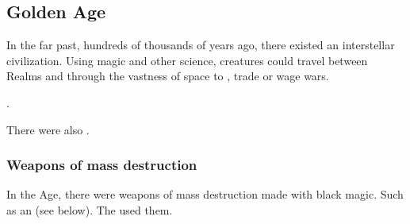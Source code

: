 \subsection{\Ophidian Golden Age}
In the far past, hundreds of thousands of years ago, there existed an \ophidian interstellar civilization. 
Using magic and other science, creatures could travel between Realms and through the vastness of space to \cooperate, trade or wage wars. 

\Sethicus {}. 

There were also . 





\subsubsection{Weapons of mass destruction}
In the \Ophidian Age, there were weapons of mass destruction made with black magic. 
Such as an  (see below). 
The \ophidians used them. 

